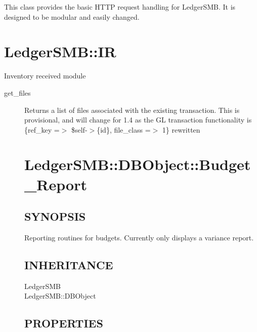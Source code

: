 \begin{description}
\begin{description}
\begin{description}
\begin{description}
\begin{description}
\begin{description}
\begin{description}
This class provides the basic HTTP request handling for LedgerSMB.  It is 
designed to be modular and easily changed.

\section{LedgerSMB::IR\label{LedgerSMB::IR}}


Inventory received module

\begin{description}

\item[{get\_files}] \mbox{}

Returns a list of files associated with the existing transaction.  This is 
provisional, and will change for 1.4 as the GL transaction functionality is 
                  \{ref\_key =$>$ \$self-$>$\{id\}, file\_class =$>$ 1\}
rewritten

\section{LedgerSMB::DBObject::Budget\_Report\label{LedgerSMB::DBObject::Budget_Report}}




\subsection*{SYNOPSIS\label{LedgerSMB::DBObject::Budget_Report_SYNOPSIS}}


Reporting routines for budgets.  Currently only displays a variance report.

\subsection*{INHERITANCE\label{LedgerSMB::DBObject::Budget_Report_INHERITANCE}}
\begin{description}

\item[{LedgerSMB}] \mbox{}
\item[{LedgerSMB::DBObject}] \mbox{}\end{description}
\subsection*{PROPERTIES\label{LedgerSMB::DBObject::Budget_Report_PROPERTIES}}
\begin{description}


\end{description}
\end{description}
\end{description}
\end{description}
\end{description}
\end{description}
\end{description}
\end{description}
\end{description}
